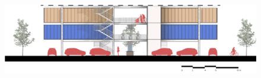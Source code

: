 ﻿%
\begin{figure}[H]
	\centering
	\includegraphics[width=\linewidth]{src/graphics/container-village--concept-self-economy.jpg}
	\label{
		fig:container-village--concept-self-economy
	}
\end{figure}
